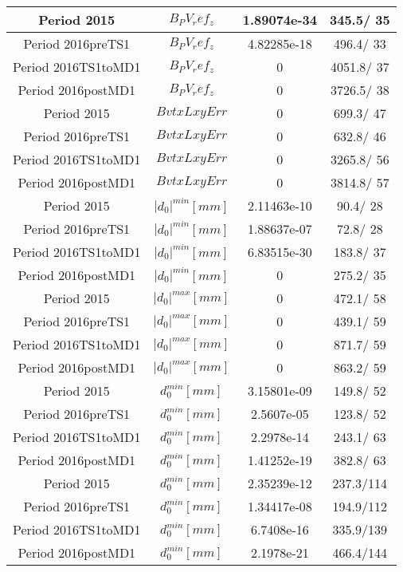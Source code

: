 \documentclass{article}
\begin{document}
\begin{longtable}{c|c|c|c}
\hline
 Period 2015 & $B_PV_ref_z$ & 1.89074e-34 & 345.5/ 35\\
\hline
 Period 2016preTS1 & $B_PV_ref_z$ & 4.82285e-18 & 496.4/ 33\\
\hline
 Period 2016TS1toMD1 & $B_PV_ref_z$ & 0 & 4051.8/ 37\\
\hline
 Period 2016postMD1 & $B_PV_ref_z$ & 0 & 3726.5/ 38\\
\hline
 Period 2015 & $BvtxLxyErr$ & 0 & 699.3/ 47\\
\hline
 Period 2016preTS1 & $BvtxLxyErr$ & 0 & 632.8/ 46\\
\hline
 Period 2016TS1toMD1 & $BvtxLxyErr$ & 0 & 3265.8/ 56\\
\hline
 Period 2016postMD1 & $BvtxLxyErr$ & 0 & 3814.8/ 57\\
\hline
 Period 2015 & $|d_{0}|^{min} [mm]$ & 2.11463e-10 &  90.4/ 28\\
\hline
 Period 2016preTS1 & $|d_{0}|^{min} [mm]$ & 1.88637e-07 &  72.8/ 28\\
\hline
 Period 2016TS1toMD1 & $|d_{0}|^{min} [mm]$ & 6.83515e-30 & 183.8/ 37\\
\hline
 Period 2016postMD1 & $|d_{0}|^{min} [mm]$ & 0 & 275.2/ 35\\
\hline
 Period 2015 & $|d_{0}|^{max} [mm]$ & 0 & 472.1/ 58\\
\hline
 Period 2016preTS1 & $|d_{0}|^{max} [mm]$ & 0 & 439.1/ 59\\
\hline
 Period 2016TS1toMD1 & $|d_{0}|^{max} [mm]$ & 0 & 871.7/ 59\\
\hline
 Period 2016postMD1 & $|d_{0}|^{max} [mm]$ & 0 & 863.2/ 59\\
\hline
 Period 2015 & $d_{0}^{min} [mm]$ & 3.15801e-09 & 149.8/ 52\\
\hline
 Period 2016preTS1 & $d_{0}^{min} [mm]$ & 2.5607e-05 & 123.8/ 52\\
\hline
 Period 2016TS1toMD1 & $d_{0}^{min} [mm]$ & 2.2978e-14 & 243.1/ 63\\
\hline
 Period 2016postMD1 & $d_{0}^{min} [mm]$ & 1.41252e-19 & 382.8/ 63\\
\hline
 Period 2015 & $d_{0}^{min} [mm]$ & 2.35239e-12 & 237.3/114\\
\hline
 Period 2016preTS1 & $d_{0}^{min} [mm]$ & 1.34417e-08 & 194.9/112\\
\hline
 Period 2016TS1toMD1 & $d_{0}^{min} [mm]$ & 6.7408e-16 & 335.9/139\\
\hline
 Period 2016postMD1 & $d_{0}^{min} [mm]$ & 2.1978e-21 & 466.4/144\\

\end{longtable}
\end{document}
